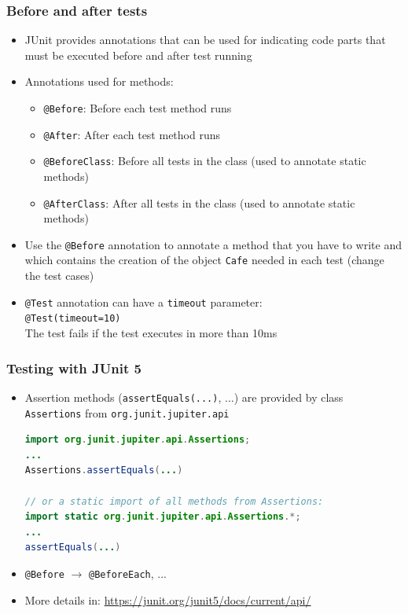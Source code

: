 \documentclass{beamer}
\begin{document}
\begin{frame}
\frametitle{Before and after tests}
\begin{itemize}
\item JUnit provides annotations that can be used for indicating code parts that must be executed before and after test running
\item Annotations used for methods:
  \begin{itemize}
  \item \texttt{@Before}: Before each test method runs 
  \item \texttt{@After}: After each test method runs
  \item \texttt{@BeforeClass}: Before all tests in the class (used to
    annotate static methods)
  \item \texttt{@AfterClass}: After all tests in the class (used to
    annotate static methods)
  \end{itemize}
\item Use the \texttt{@Before} annotation to annotate a method that
  you have to write and which contains the creation of the object
  \texttt{Cafe} needed in each test (change the test cases)
\item \texttt{@Test} annotation can have a \texttt{timeout} parameter:\\
  \texttt{@Test(timeout=10)}\\
  The test fails if the test executes in more than 10ms
\end{itemize}
\end{frame}

\begin{frame}[fragile]
\frametitle{Testing with JUnit 5}
\begin{itemize}
\item Assertion methods (\texttt{assertEquals(...)}, ...) are provided
  by class \texttt{Assertions} from \texttt{org.junit.jupiter.api}
\begin{tiny}
\begin{lstlisting}[language=JAVA]
import org.junit.jupiter.api.Assertions;
...
Assertions.assertEquals(...)

// or a static import of all methods from Assertions:
import static org.junit.jupiter.api.Assertions.*;
...
assertEquals(...)
\end{lstlisting}                
\end{tiny}
\item \texttt{@Before} $\rightarrow$ \texttt{@BeforeEach}, ...
\item More details in:
  \footnotesize
  \url{https://junit.org/junit5/docs/current/api/}
  \normalsize
\end{itemize}
\end{frame}
\end{document}
